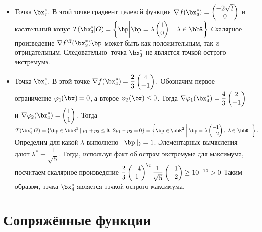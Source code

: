\documentclass[12pt]{article}
\begin{document}
\begin{itemize}
\item Точка $\bx^*_3$. 
В этой точке градиент целевой функции $\nabla f(\bx^*_3) = 
\begin{pmatrix}
-2\sqrt{2}\\
0
\end{pmatrix}
$
и касательный конус $T(\bx^*_3|G) = \left \{ \bp \middle| \bp = \lambda 
\begin{pmatrix}
1\\
0
\end{pmatrix} \;
, \;
\lambda \in \bbR \right\}
$
Скалярное произведение $\nabla f^{\T}(\bx^*_3)\bp$ может быть как положительным, так и отрицательным.
Следовательно, точка $\bx^*_3$ не является точкой острого экстремума.
\item Точка $\bx^*_4$. В этой точке $\nabla f(\bx^*_4) = \dfrac{2}{3}
\begin{pmatrix}
4\\
-1
\end{pmatrix}.  
$
Обозначим первое ограничение $\varphi_1(\bx) = 0$, а второе $\varphi_2(\bx) \leq 0$.
Тогда $\nabla \varphi_1(\bx^*_4) = \dfrac{4}{3} 
\begin{pmatrix}
2\\
-1
\end{pmatrix}
$ и $\nabla \varphi_2(\bx^*_4) = 
\begin{pmatrix}
1\\
1
\end{pmatrix}.
$
Тогда $T(\bx^*_4|G) = \{\bp \in \bbR^2 \; | \; p_1 + p_2 \leq 0, \; 2p_1 - p_2 = 0 \} = \left \{ \bp \in \bbR^2 \; \middle| \; \bp = \lambda \begin{pmatrix}
-1\\
-2
\end{pmatrix}, \; \lambda \in \bbR_+ \right\}.$
Определим для какой $\lambda$ выполнено $\|\bp\|_2 = 1$.
Элементарные вычисления дают $\lambda^* = \dfrac{1}{\sqrt{5}}$.
Тогда, используя факт об остром экстремуме для максимума, посчитаем скалярное произведение $\dfrac{2}{3}
\begin{pmatrix}
-4\\
1
\end{pmatrix}^{\T}
\dfrac{1}{\sqrt{5}} 
\begin{pmatrix}
-1\\
-2
\end{pmatrix} \geq 10^{-10} > 0
$
Таким образом, точка $\bx^*_4$ является точкой острого максимума.
\end{itemize}

\section{Сопряжённые функции}
\end{document}

